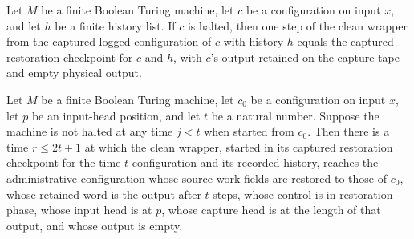 \begin{lemma}
\label{Complexity.enumCont_clean_undo_entry}
\leanok
{}
Let $M$ be a finite Boolean Turing machine, let $c$ be a configuration on input $x$, and
let $h$ be a finite history list. If $c$ is halted, then one step of the clean wrapper
from the captured logged configuration of $c$ with history $h$ equals the captured
restoration checkpoint for $c$ and $h$, with $c$'s output retained on the capture tape
and empty physical output.
\end{lemma}

\begin{lemma}
\label{Complexity.enumCont_clean_restore}
\leanok
{}
Let $M$ be a finite Boolean Turing machine, let $c_0$ be a configuration on input $x$,
let $p$ be an input-head position, and let $t$ be a natural number. Suppose the machine
is not halted at any time $j<t$ when started from $c_0$. Then there is a time $r \le
2t+1$ at which the clean wrapper, started in its captured restoration checkpoint for the
time-$t$ configuration and its recorded history, reaches the administrative
configuration whose source work fields are restored to those of $c_0$, whose retained
word is the output after $t$ steps, whose control is in restoration phase, whose input
head is at $p$, whose capture head is at the length of that output, and whose output is
empty.
\end{lemma}

